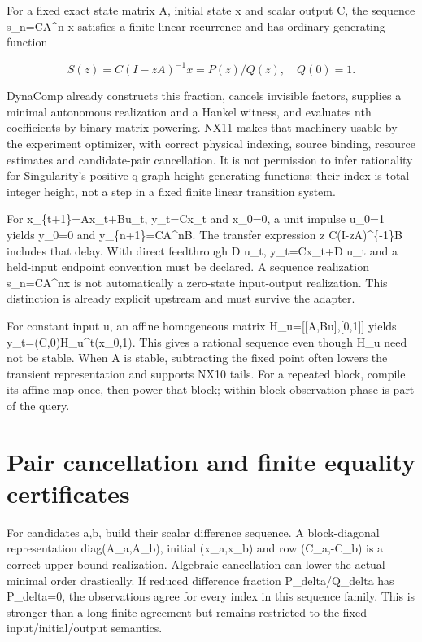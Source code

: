 \documentclass[
  11pt,
  a4paper,
]{report}
\begin{document}
For a fixed exact state matrix A, initial state x and scalar output C,
the sequence s\_n=CA\^{}n x satisfies a finite linear recurrence and has
ordinary generating function

\[
S(z)=C(I-zA)^{-1}x=P(z)/Q(z),\quad Q(0)=1.
\]

DynaComp already constructs this fraction, cancels invisible factors,
supplies a minimal autonomous realization and a Hankel witness, and
evaluates nth coefficients by binary matrix powering. NX11 makes that
machinery usable by the experiment optimizer, with correct physical
indexing, source binding, resource estimates and candidate-pair
cancellation. It is not permission to infer rationality for
Singularity's positive-q graph-height generating functions: their index
is total integer height, not a step in a fixed finite linear transition
system.

For x\_\{t+1\}=Ax\_t+Bu\_t, y\_t=Cx\_t and x\_0=0, a unit impulse u\_0=1
yields y\_0=0 and y\_\{n+1\}=CA\^{}nB. The transfer expression z
C(I-zA)\^{}\{-1\}B includes that delay. With direct feedthrough D u\_t,
y\_t=Cx\_t+D u\_t and a held-input endpoint convention must be declared.
A sequence realization s\_n=CA\^{}nx is not automatically a zero-state
input-output realization. This distinction is already explicit upstream
and must survive the adapter.

For constant input u, an affine homogeneous matrix
H\_u={[}{[}A,Bu{]},{[}0,1{]}{]} yields y\_t=(C,0)H\_u\^{}t(x\_0,1). This
gives a rational sequence even though H\_u need not be stable. When A is
stable, subtracting the fixed point often lowers the transient
representation and supports NX10 tails. For a repeated block, compile
its affine map once, then power that block; within-block observation
phase is part of the query.

\hypertarget{pair-cancellation-and-finite-equality-certificates}{%
\section{Pair cancellation and finite equality
certificates}\label{pair-cancellation-and-finite-equality-certificates}}

For candidates a,b, build their scalar difference sequence. A
block-diagonal representation diag(A\_a,A\_b), initial (x\_a,x\_b) and
row (C\_a,-C\_b) is a correct upper-bound realization. Algebraic
cancellation can lower the actual minimal order drastically. If reduced
difference fraction P\_delta/Q\_delta has P\_delta=0, the observations
agree for every index in this sequence family. This is stronger than a
long finite agreement but remains restricted to the fixed
input/initial/output semantics.
\end{document}
